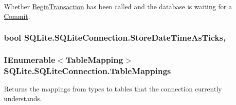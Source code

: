 Whether \hyperlink{class_s_q_lite_1_1_s_q_lite_connection_aba3becdb524808bd49f349587f1b7049}{Begin\+Transaction} has been called and the database is waiting for a \hyperlink{class_s_q_lite_1_1_s_q_lite_connection_a2c8187a19b5065f6b23c079e7cca29fe}{Commit}. 

\hypertarget{class_s_q_lite_1_1_s_q_lite_connection_a1c24728cf622f060629aac155e2afcaa}{
\subsubsection[{Store\+Date\+Time\+As\+Ticks}]{\setlength{\rightskip}{0pt plus 5cm}bool S\+Q\+Lite.\+S\+Q\+Lite\+Connection.\+Store\+Date\+Time\+As\+Ticks\hspace{0.3cm}{\ttfamily [get]}, {\ttfamily [set]}}}\label{class_s_q_lite_1_1_s_q_lite_connection_a1c24728cf622f060629aac155e2afcaa}
\hypertarget{class_s_q_lite_1_1_s_q_lite_connection_ac0c3b1e8f8060ef9777fac08751d159e}{
\subsubsection[{Table\+Mappings}]{\setlength{\rightskip}{0pt plus 5cm}I\+Enumerable$<${\bf Table\+Mapping}$>$ S\+Q\+Lite.\+S\+Q\+Lite\+Connection.\+Table\+Mappings\hspace{0.3cm}{\ttfamily [get]}}}\label{class_s_q_lite_1_1_s_q_lite_connection_ac0c3b1e8f8060ef9777fac08751d159e}


Returns the mappings from types to tables that the connection currently understands. 

